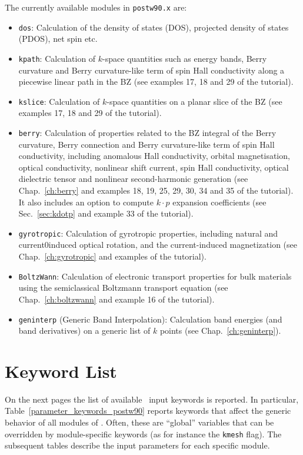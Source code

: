 The currently available modules in \texttt{postw90.x} are:
\begin{itemize}
\item \texttt{dos}: Calculation of the density of states (DOS), projected
  density of states (PDOS), net spin etc.
\item \texttt{kpath}: Calculation of $k$-space quantities such as
  energy bands, Berry curvature and Berry curvature-like term 
  of spin Hall conductivity along a piecewise linear path in
  the BZ (see examples 17, 18 and 29 of the tutorial).
\item \texttt{kslice}: Calculation of $k$-space quantities on a planar
  slice of the BZ (see examples 17, 18 and 29 of the tutorial).
\item \texttt{berry}: Calculation of properties related to the BZ
  integral of the Berry curvature, Berry connection and 
  Berry curvature-like term of spin Hall conductivity, including
  anomalous Hall conductivity, orbital magnetisation, optical
  conductivity, nonlinear shift current, spin Hall conductivity, optical dielectric tensor and nonlinear second-harmonic generation
  (see Chap.~\ref{ch:berry} and examples 18, 19, 25, 29, 30, 34 and 35 of the
  tutorial). It also includes an option to compute $k\cdot p$ expansion coefficients
  (see Sec.~\ref{sec:kdotp} and example 33 of the tutorial).
\item \texttt{gyrotropic}: Calculation of gyrotropic properties, 
    including natural and current0induced optical rotation, 
and the current-induced magnetization
   (see Chap.~\ref{ch:gyrotropic} and examples  of the
  tutorial).
\item \texttt{BoltzWann}: Calculation of electronic transport
  properties for bulk materials using the semiclassical Boltzmann
  transport equation (see Chap.~\ref{ch:boltzwann} and example 16 of
  the tutorial).
\item \texttt{geninterp} (Generic Band Interpolation): Calculation band energies (and band
  derivatives) on a generic list of $k$ points (see Chap.~\ref{ch:geninterp}).
\end{itemize}


\section{Keyword List}
On the next pages the list of available \postw\ input keywords is
reported.  In particular, Table~\ref{parameter_keywords_postw90}
reports keywords that affect the generic behavior of all modules of
\postw. Often, these are ``global'' variables that can be overridden
by module-specific keywords (as for instance the {\tt kmesh}
flag). The subsequent tables describe the input parameters for each
specific module.

